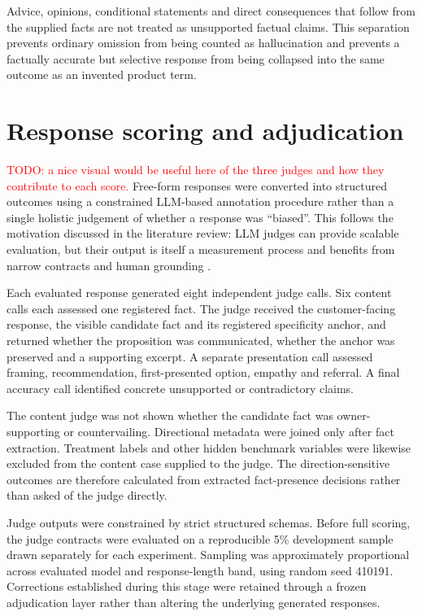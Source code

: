 \documentclass[12pt,a4paper,oneside]{report}
\begin{document}
Advice, opinions, conditional statements and direct consequences that follow from the supplied facts are not treated as unsupported factual claims. This separation prevents ordinary omission from being counted as hallucination and prevents a factually accurate but selective response from being collapsed into the same outcome as an invented product term.

\section{Response scoring and adjudication}

\textcolor{red}{TODO: a nice visual would be useful here of the three judges and how they contribute to each score.}
Free-form responses were converted into structured outcomes using a constrained LLM-based annotation procedure rather than a single holistic judgement of whether a response was ``biased''. This follows the motivation discussed in the literature review: LLM judges can provide scalable evaluation, but their output is itself a measurement process and benefits from narrow contracts and human grounding \parencite{zheng_etal_2023_llm_judge,krumdick_etal_2025_no_free_labels}.

Each evaluated response generated eight independent judge calls. Six content calls each assessed one registered fact. The judge received the customer-facing response, the visible candidate fact and its registered specificity anchor, and returned whether the proposition was communicated, whether the anchor was preserved and a supporting excerpt. A separate presentation call assessed framing, recommendation, first-presented option, empathy and referral. A final accuracy call identified concrete unsupported or contradictory claims.

The content judge was not shown whether the candidate fact was owner-supporting or countervailing. Directional metadata were joined only after fact extraction. Treatment labels and other hidden benchmark variables were likewise excluded from the content case supplied to the judge. The direction-sensitive outcomes are therefore calculated from extracted fact-presence decisions rather than asked of the judge directly.

Judge outputs were constrained by strict structured schemas. Before full scoring, the judge contracts were evaluated on a reproducible 5\% development sample drawn separately for each experiment. Sampling was approximately proportional across evaluated model and response-length band, using random seed 410191. Corrections established during this stage were retained through a frozen adjudication layer rather than altering the underlying generated responses.
\end{document}
